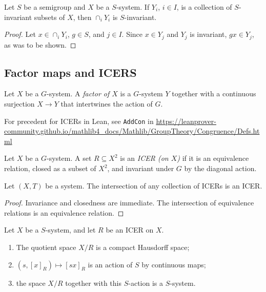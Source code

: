 \begin{lemma}
    \label{lemma_intersection_of_invariant}
    \leanok{}
    Let $S$ be a semigroup and $X$ be a $S$-system.  If $Y_i$, $i \in I$, is a collection of $S$-invariant subsets of $X$, then $\cap_i Y_i$ is $S$-invariant.
\end{lemma}

\begin{proof}
\leanok{}
    Let $x \in \cap_i Y_i$, $g \in S$, and $j \in I$.  Since $x \in Y_j$ and $Y_j$ is invariant, $gx \in Y_j$, as was to be shown.
\end{proof}

\subsection{Factor maps and ICERS}

\begin{definition}[Factor]
    \leanok{}
Let $X$ be a $G$-system.  A \emph{factor of $X$} is a $G$-system $Y$ together with a continuous surjection $X \to Y$ that intertwines the action of $G$.
\end{definition}

\begin{leanrmk}
    For precedent for ICERs in Lean, see \verb|AddCon| in \url{https://leanprover-community.github.io/mathlib4_docs/Mathlib/GroupTheory/Congruence/Defs.html}
\end{leanrmk}

\begin{definition}[ICER]
\leanok{}
    Let $X$ be a $G$-system.  A set $R \subseteq X^2$ is an \emph{ICER (on $X$)} if it is an equivalence relation, closed as a subset of $X^2$, and invariant under $G$ by the diagonal action.
\end{definition}

\begin{lemma}
\label{lemma_intersection_of_icers}
\leanok{}
    Let $(X,T)$ be a system.  The intersection of any collection of ICERs is an ICER.
\end{lemma}

\begin{proof}
\leanok{}
    Invariance and closedness are immediate. The intersection of equivalence relations is an equivalence relation.
\end{proof}

\begin{theorem}
\label{thm_quotient_system}
\leanok{}
    Let $X$ be a $S$-system, and let $R$ be an ICER on $X$.
    \begin{enumerate}
        \item The quotient space $X/R$ is a compact Hausdorff space;
        \item $(s,[x]_R) \mapsto [sx]_R$ is an action of $S$ by continuous maps;
        \item the space $X/R$ together with this $S$-action is a $S$-system.
    \end{enumerate}
\end{theorem}

